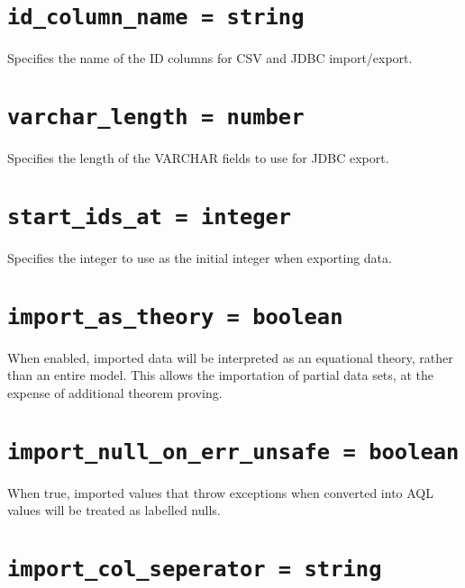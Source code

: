 \documentclass[10pt]{book}
\begin{document}
%

%
%
%
\section{{\tt id\_column\_name = string}}
Specifies the name of the ID columns for CSV and JDBC import/export.

\section{{\tt varchar\_length = number}}
Specifies the length of the VARCHAR fields to use for JDBC export.

\section{ {\tt start\_ids\_at = integer}}

Specifies the integer to use as the initial integer when exporting data.

\section{ {\tt import\_as\_theory = boolean}}

When enabled, imported data will be interpreted as an equational theory, rather than an entire model.  This allows the importation of partial data sets, at the expense of additional theorem proving.

\section{ {\tt import\_null\_on\_err\_unsafe = boolean} }

When true, imported values that throw exceptions when converted into AQL values will be treated as labelled nulls.
			
\section{ {\tt import\_col\_seperator = string} }
\end{document}
